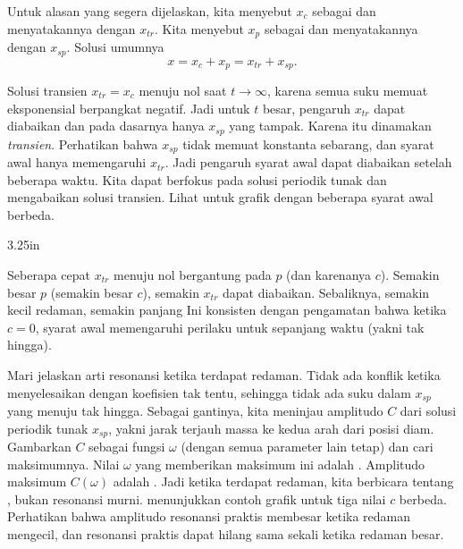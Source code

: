 \medskip

Untuk alasan yang segera dijelaskan, kita menyebut $x_c$ sebagai \emph{} dan menyatakannya dengan $x_{tr}$. Kita menyebut $x_p$ sebagai \emph{} dan menyatakannya dengan $x_{sp}$. Solusi umumnya
\begin{equation*}
x = x_c + x_p = x_{tr} + x_{sp} .
\end{equation*}

Solusi transien $x_{tr} = x_c$ menuju nol saat $t \to \infty$, karena semua suku memuat eksponensial berpangkat negatif. Jadi untuk $t$ besar, pengaruh $x_{tr}$ dapat diabaikan dan pada dasarnya hanya $x_{sp}$ yang tampak. Karena itu dinamakan \emph{transien}. Perhatikan bahwa $x_{sp}$ tidak memuat konstanta sebarang, dan syarat awal hanya memengaruhi $x_{tr}$. Jadi pengaruh syarat awal dapat diabaikan setelah beberapa waktu.
Kita dapat berfokus pada solusi periodik tunak dan mengabaikan solusi transien. Lihat  untuk grafik dengan beberapa syarat awal berbeda.

\begin{mywrapfig}[15]{3.25in}
\capstart
{}
\caption{Solusi dengan syarat awal berbeda untuk parameter
$k=1$, $m=1$, $F_0 = 1$, $c=0.7$, dan $\omega=1.1$.\label{3.6:transbehfig}}
\end{mywrapfig}

Seberapa cepat $x_{tr}$ menuju nol bergantung pada $p$ (dan karenanya $c$). Semakin besar $p$ (semakin besar $c$), semakin  $x_{tr}$ dapat diabaikan. Sebaliknya, semakin kecil redaman, semakin panjang  Ini konsisten dengan pengamatan bahwa ketika $c=0$, syarat awal memengaruhi perilaku untuk sepanjang waktu (yakni  tak hingga).

\medskip

Mari jelaskan arti resonansi ketika terdapat redaman. Tidak ada konflik ketika menyelesaikan dengan koefisien tak tentu, sehingga tidak ada suku dalam $x_{sp}$ yang menuju tak hingga. Sebagai gantinya, kita meninjau amplitudo $C$ dari solusi periodik tunak $x_{sp}$, yakni jarak terjauh massa ke kedua arah dari posisi diam. Gambarkan $C$ sebagai fungsi $\omega$ (dengan semua parameter lain tetap) dan cari maksimumnya. Nilai $\omega$ yang memberikan maksimum ini adalah \emph{}. Amplitudo maksimum $C(\omega)$ adalah \emph{}. Jadi ketika terdapat redaman, kita berbicara tentang \emph{}, bukan resonansi murni.  menunjukkan contoh grafik untuk tiga nilai $c$ berbeda. Perhatikan bahwa amplitudo resonansi praktis membesar ketika redaman mengecil, dan resonansi praktis dapat hilang sama sekali ketika redaman besar.

